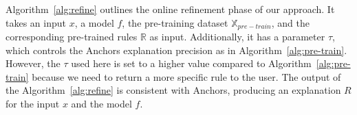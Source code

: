 Algorithm~\ref{alg:refine} outlines the online refinement phase of our approach. It takes an input \(x\), a model \(f\), the pre-training dataset \(\mathbb{X}_{pre-train}\), and the corresponding pre-trained rules \(\mathbb{R}\) as input. Additionally, it has a  parameter \(\tau\), which controls the Anchors explanation precision as in Algorithm~\ref{alg:pre-train}. However, the \(\tau\) used here is set to a higher value compared to Algorithm~\ref{alg:pre-train} because we need to return a more specific rule to the user. 
The output of the Algorithm~\ref{alg:refine} is consistent with Anchors, producing an explanation \(R\) for the input \(x\) and the model \(f\).





